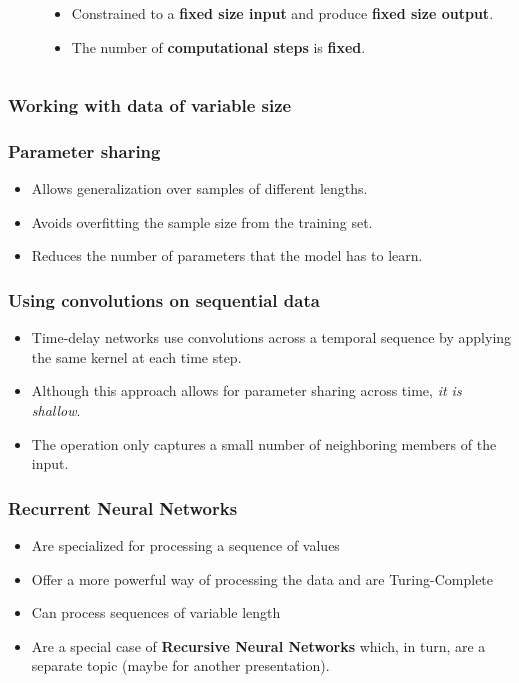 \documentclass{beamer}
\begin{document}
\begin{frame}
\begin{columns}
\begin{column}{0.3\textwidth}
\begin{center}
      \end{center}
    \end{column}
    \begin{column}{0.7\textwidth}
      \begin{itemize}
        \item Constrained to a \textbf{fixed size input} and produce \textbf{fixed size output}.
        \item The number of \textbf{computational steps} is \textbf{fixed}.
      \end{itemize}
    \end{column}
  \end{columns}
\end{frame}
\begin{frame}
  \frametitle{Working with data of variable size}

\end{frame}
\begin{frame}
  \frametitle{Parameter sharing}
  \begin{itemize}
    \item Allows generalization over samples of different lengths.
    \item Avoids overfitting the sample size from the training set.
    \item Reduces the number of parameters that the model has to learn.
  \end{itemize}
\end{frame}
\begin{frame}
  \frametitle{Using convolutions on sequential data \cite{goodfellow-et-al-2016}}
  \begin{itemize}
    \item Time-delay networks use convolutions across a temporal sequence by applying the same kernel at each time step.
    \item Although this approach allows for parameter sharing across time, \textit{it is shallow}.
    \item The operation only captures a small number of neighboring members of the input.
  \end{itemize}
\end{frame}
\begin{frame}
  \frametitle{Recurrent Neural Networks}
  \begin{itemize}
    \item Are specialized for processing a sequence of values \cite{goodfellow-et-al-2016}
    \item Offer a more powerful way of processing the data \cite{rnn-lecture} and are Turing-Complete \cite{siegelmann1995}
    \item Can process sequences of variable length \cite{goodfellow-et-al-2016}
    \item Are a special case of \textbf{Recursive Neural Networks} which, in turn, are a separate topic (maybe for another presentation).
  \end{itemize}
\end{frame}
\end{document}
